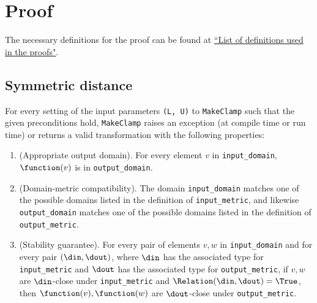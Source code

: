 \section{Proof}
The necessary definitions for the proof can be found at \href{https://www.overleaf.com/project/60d214e390b337703d200982}{``List of definitions used in the proofs"}.

\subsection{Symmetric distance}
\begin{theorem}
    For every setting of the input parameters \texttt{(L, U)} to \texttt{MakeClamp} such that the given preconditions
    hold, \texttt{MakeClamp} raises an exception (at compile time or run time) or returns a valid transformation with the following properties:
    \begin{enumerate}
        \item \textup{(Appropriate output domain).} For every element $v$ in \texttt{input\_domain}, $\function(v)$ is in \texttt{output\_domain}. %
        
        \item \textup{(Domain-metric compatibility).} The domain \texttt{input\_domain} matches one of the possible domains listed in the definition of \texttt{input\_metric}, and likewise \texttt{output\_domain} matches one of the possible domains listed in the definition of \texttt{output\_metric}.
        
        \item \textup{(Stability guarantee).} For every pair of elements $v, w$ in \texttt{input\_domain} and for every pair $(\din, \dout)$, where $\din$ has the associated type for \texttt{input\_metric} and $\dout$ has the associated type for \texttt{output\_metric}, if $v,w$ are $\din$-close under \texttt{input\_metric} and $\Relation(\din, \dout) = \True$, then $\function(v), \function(w)$ are $\dout$-close under \texttt{output\_metric}.
    \end{enumerate}
\end{theorem}


